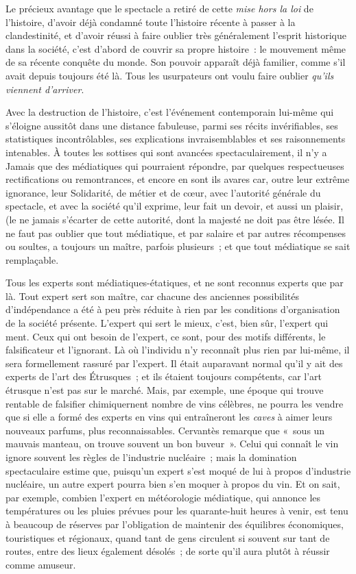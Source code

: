 \documentclass[french,twoside]{book} %
\def\mednobreak{\ifdim\lastskip<\medskipamount
  \removelastskip\nopagebreak\medskip\fi}
\newcommand{\labelblock}[1]{\medbreak{\noindent\color{rubric}\bfseries #1}\par\mednobreak}
\begin{document}
Le précieux avantage que le spectacle a retiré de cette \emph{mise hors la loi} de l’histoire, d’avoir déjà condamné toute l’histoire récente à passer à la clandestinité, et d’avoir réussi à faire oublier très généralement l’esprit historique dans la société, c’est d’abord de couvrir sa propre histoire : le mouvement même de sa récente conquête du monde. Son pouvoir apparaît déjà familier, comme s’il avait depuis toujours été là. Tous les usurpateurs ont voulu faire oublier \emph{qu’ils viennent d’arriver}.\par

\labelblock{VII}

\noindent Avec la destruction de l’histoire, c’est l’événement contemporain lui-même qui s’éloigne aussitôt dans une distance fabuleuse, parmi ses récits invérifiables, ses statistiques incontrôlables, ses explications invraisemblables et ses raisonnements intenables. À toutes les sottises qui sont avancées spectaculairement, il n’y a Jamais que des médiatiques qui pourraient répondre, par quelques respectueuses rectifications ou remontrances, et encore en sont ils avares car, outre leur extrême ignorance, leur Solidarité, de métier et de cœur, avec l’autorité générale du spectacle, et avec la société qu’il exprime, leur fait un devoir, et aussi un plaisir, (le ne jamais s’écarter de cette autorité, dont la majesté ne doit pas être lésée. Il ne faut pas oublier que tout médiatique, et par salaire et par autres récompenses ou soultes, a toujours un maître, parfois plusieurs ; et que tout médiatique se sait remplaçable.\par
Tous les experts sont médiatiques-étatiques, et ne sont reconnus experts que par là. Tout expert sert son maître, car chacune des anciennes possibilités d’indépendance a été à peu près réduite à rien par les conditions d’organisation de la société présente. L’expert qui sert le mieux, c’est, bien sûr, l’expert qui ment. Ceux qui ont besoin de l’expert, ce sont, pour des motifs différents, le falsificateur et l’ignorant. Là où l’individu n’y reconnaît plus rien par lui-même, il sera formellement rassuré par l’expert. Il était auparavant normal qu’il y ait des experts de l’art des Étrusques ; et ils étaient toujours compétents, car l’art étrusque n’est pas sur le marché. Mais, par exemple, une époque qui trouve rentable de falsifier chimiquernent nombre de vins célèbres, ne pourra les vendre que si elle a formé des experts en vins qui entraîneront les \emph{caves} à aimer leurs nouveaux parfums, plus reconnaissables. Cervantès remarque que « sous un mauvais manteau, on trouve souvent un bon buveur ». Celui qui connaît le vin ignore souvent les règles de l’industrie nucléaire ; mais la domination spectaculaire estime que, puisqu’un expert s’est moqué de lui à propos d’industrie nucléaire, un autre expert pourra bien s’en moquer à propos du vin. Et on sait, par exemple, combien l’expert en météorologie médiatique, qui annonce les températures ou les pluies prévues pour les quarante-huit heures à venir, est tenu à beaucoup de réserves par l’obligation de maintenir des équilibres économiques, touristiques et régionaux, quand tant de gens circulent si souvent sur tant de routes, entre des lieux également désolés ; de sorte qu’il aura plutôt à réussir comme amuseur.\par
\end{document}
